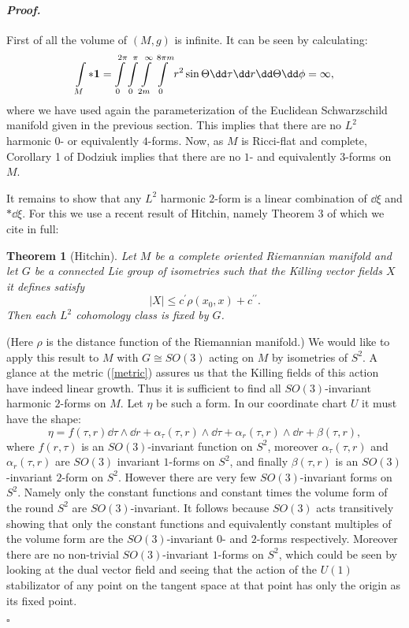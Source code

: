 \documentclass[a4paper,12pt,draft]{article}
\newtheorem{theorem}{Theorem}[section]
\newenvironment{proof}{\paragraph{\it Proof.}}{$\square$\vskip0.4cm}
\begin{document}
\begin{proof} First of all the volume of $(M,g)$ is infinite. It can be
seen by calculating:
\[\int\limits_M*{\bf 1}
=\int\limits_0^{2\pi}\int\limits_0^\pi\int\limits_{2m}^\infty\int\limits_0^
{8\pi m}r^2\sin\Theta\dd\tau\dd r\dd\Theta\dd\phi =\infty,\] 
where we have used again the parameterization of the Euclidean
Schwarzschild manifold given in the previous section. 
This implies that there are no $L^2$ harmonic $0$- or equivalently
$4$-forms. Now, as $M$ is Ricci-flat and complete, 
Corollary 1 of Dodziuk \cite{dodziuk} implies that there
are no $1$- and equivalently $3$-forms on $M$. 

It remains to show that any $L^2$ harmonic $2$-form is a linear combination 
of $\dd\xi$ and $*\dd\xi$. For this we use a recent result of Hitchin,
namely Theorem 3 of
\cite{hitchin} which we cite in full:

\begin{theorem}[Hitchin] Let $M$ be a complete oriented Riemannian manifold
and let $G$ be a connected Lie group of isometries such that the Killing 
vector fields $X$ it defines satisfy $$\vert X\vert\leq c^\prime
\rho(x_0,x)+ c^{\prime\prime}.$$ Then each $L^2$ cohomology class is fixed
by $G$.
\end{theorem}
(Here $\rho$ is the distance function of the Riemannian manifold.)
We would like to apply this result to $M$ with $G\cong SO(3)$ acting on $M$ 
by isometries of $S^2$. A glance at the metric (\ref{metric}) assures us
that the Killing fields of this action have indeed linear growth. 
Thus it is sufficient to  
find all $SO(3)$-invariant harmonic $2$-forms on $M$. Let $\eta$ be such
a form. In our coordinate chart $U$ it  must have the shape: 
$$\eta=f(\tau, r)\dd\tau\wedge\dd r + \alpha_\tau (\tau ,r)\wedge\dd\tau +
\alpha_r(\tau ,r)\wedge\dd r +\beta (\tau ,r),$$ 
where $f(r,\tau)$ is an $SO(3)$-invariant function on $S^2$, moreover 
$\alpha_\tau (\tau ,r)$ and $\alpha_r(\tau, r)$ are $SO(3)$ invariant
$1$-forms on $S^2$, and
finally $\beta (\tau ,r)$ is an $SO(3)$-invariant $2$-form on $S^2$.
However there are very few $SO(3)$-invariant forms on $S^2$.
Namely only the constant functions and constant times the volume form of the 
round $S^2$ are $SO(3)$-invariant. It follows because $SO(3)$ acts 
transitively showing that only the constant functions and equivalently 
constant multiples of the volume form are the $SO(3)$-invariant $0$- and 
$2$-forms respectively. Moreover there are no non-trivial
$SO(3)$-invariant $1$-forms on $S^2$, which could be seen by looking at
the dual vector field and seeing that the action of the $U(1)$
stabilizator of any point on the tangent space at that point has only 
the origin as its fixed point. 


\end{proof}
\end{document}
